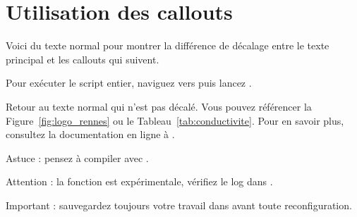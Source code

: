 \section{Utilisation des callouts}

Voici du texte normal pour montrer la différence de décalage entre 
le texte principal et les callouts qui suivent.

\begin{InfoBox}
Pour exécuter le script entier, naviguez vers  puis lancez .
\end{InfoBox}

Retour au texte normal qui n'est pas décalé. Vous pouvez référencer la Figure~\ref{fig:logo_rennes} ou le Tableau~\ref{tab:conductivite}. 
Pour en savoir plus, consultez la documentation en ligne à .

\begin{TipBox}
Astuce : pensez à compiler avec .
\end{TipBox}

\begin{WarningBox}
Attention : la fonction  est expérimentale, vérifiez le log dans .
\end{WarningBox}

\begin{ImportantBox}
Important : sauvegardez toujours votre travail dans  avant toute reconfiguration.
\end{ImportantBox}